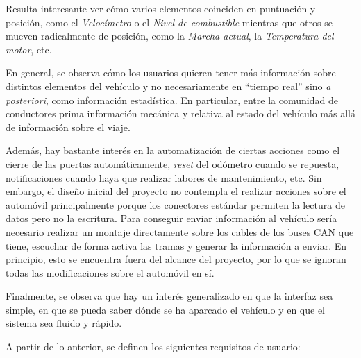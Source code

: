 Resulta interesante ver cómo varios elementos coinciden en puntuación y posición, como
el \textit{Velocímetro} o el \textit{Nivel de combustible} mientras que otros se
mueven radicalmente de posición, como la \textit{Marcha actual}, la \textit{Temperatura 
del motor}, etc.

En general, se observa cómo los usuarios quieren tener más información sobre distintos
elementos del vehículo y no necesariamente en ``tiempo real'' sino \textit{a posteriori},
como información estadística. En particular, entre la comunidad de conductores prima
información mecánica y relativa al estado del vehículo más allá de información sobre
el viaje.

Además, hay bastante interés en la automatización de ciertas acciones como el cierre
de las puertas automáticamente, \textit{reset} del odómetro cuando se repuesta, 
notificaciones cuando haya que realizar labores de mantenimiento, etc. Sin embargo,
el diseño inicial del proyecto no contempla el realizar acciones sobre el automóvil
principalmente porque los conectores estándar permiten la lectura de
datos pero no la escritura. Para conseguir enviar información al vehículo sería
necesario realizar un montaje directamente sobre los cables de los buses \ac{CAN} que
tiene, escuchar de forma activa las tramas y generar la información a enviar.
En principio, esto se encuentra fuera del alcance del proyecto, por lo que se
ignoran todas las modificaciones sobre el automóvil en sí.

Finalmente, se observa que hay un interés generalizado en que la interfaz sea
simple, en que se pueda saber dónde se ha aparcado el vehículo y
en que el sistema sea fluido y rápido.

A partir de lo anterior, se definen los siguientes requisitos de usuario:

